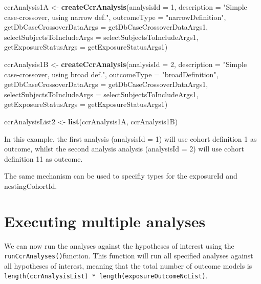 \documentclass[]{article}
\newenvironment{Shaded}{\begin{snugshade}}{\end{snugshade}}
\newcommand{\DataTypeTok}[1]{\textcolor[rgb]{0.13,0.29,0.53}{#1}}
\newcommand{\DecValTok}[1]{\textcolor[rgb]{0.00,0.00,0.81}{#1}}
\newcommand{\KeywordTok}[1]{\textcolor[rgb]{0.13,0.29,0.53}{\textbf{#1}}}
\newcommand{\NormalTok}[1]{#1}
\newcommand{\StringTok}[1]{\textcolor[rgb]{0.31,0.60,0.02}{#1}}
\begin{document}
\begin{Shaded}
\begin{Highlighting}[]
\NormalTok{ccrAnalysis1A <-}\StringTok{ }\KeywordTok{createCcrAnalysis}\NormalTok{(}\DataTypeTok{analysisId =} \DecValTok{1}\NormalTok{,}
                                 \DataTypeTok{description =} \StringTok{"Simple case-crossover, using narrow def."}\NormalTok{,}
                                 \DataTypeTok{outcomeType =} \StringTok{"narrowDefinition"}\NormalTok{,}
                                 \DataTypeTok{getDbCaseCrossoverDataArgs =}\NormalTok{ getDbCaseCrossoverDataArgs1,}
                                 \DataTypeTok{selectSubjectsToIncludeArgs =}\NormalTok{ selectSubjectsToIncludeArgs1,}
                                 \DataTypeTok{getExposureStatusArgs =}\NormalTok{ getExposureStatusArgs1)}

\NormalTok{ccrAnalysis1B <-}\StringTok{ }\KeywordTok{createCcrAnalysis}\NormalTok{(}\DataTypeTok{analysisId =} \DecValTok{2}\NormalTok{,}
                                 \DataTypeTok{description =} \StringTok{"Simple case-crossover, using broad def."}\NormalTok{,}
                                 \DataTypeTok{outcomeType =} \StringTok{"broadDefinition"}\NormalTok{,}
                                 \DataTypeTok{getDbCaseCrossoverDataArgs =}\NormalTok{ getDbCaseCrossoverDataArgs1,}
                                 \DataTypeTok{selectSubjectsToIncludeArgs =}\NormalTok{ selectSubjectsToIncludeArgs1,}
                                 \DataTypeTok{getExposureStatusArgs =}\NormalTok{ getExposureStatusArgs1)}

\NormalTok{ccrAnalysisList2 <-}\StringTok{ }\KeywordTok{list}\NormalTok{(ccrAnalysis1A, ccrAnalysis1B)}
\end{Highlighting}
\end{Shaded}

In this example, the first analysis (analysisId = 1) will use cohort
definition 1 as outcome, whilst the second analysis analysis (analysisId
= 2) will use cohort definition 11 as outcome.

The same mechanism can be used to specifiy types for the exposureId and
nestingCohortId.

\hypertarget{executing-multiple-analyses}{%
\section{Executing multiple
analyses}\label{executing-multiple-analyses}}

We can now run the analyses against the hypotheses of interest using the
\texttt{runCcrAnalyses()}function. This function will run all specified
analyses against all hypotheses of interest, meaning that the total
number of outcome models is
\texttt{length(ccrAnalysisList)\ *\ length(exposureOutcomeNcList)}.
\end{document}
